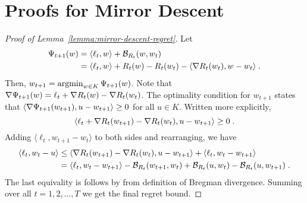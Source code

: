 \section{Proofs for Mirror Descent}
\label{section:mirror-descent-proofs}

\begin{proof}[Proof of Lemma~\ref{lemma:mirror-descent-regret}]
Let
\begin{align*}
\Psi_{t+1}(w)
& = \langle \ell_t, w \rangle + \mathcal{B}_{R_t}(w,w_t) \\
& = \langle \ell_t, w \rangle + R_t(w) - R_t(w_t) - \langle \nabla R_t(w_t) , w - w_t \rangle \; .
\end{align*}
Then, $w_{t+1} = \operatorname*{argmin}_{w \in K} \Psi_{t+1}(w)$. Note that $\nabla \Psi_{t+1}(w) = \ell_t + \nabla R_t(w) - \nabla R_t(w_t)$. The optimality
condition for $w_{t+1}$ states that $\langle \nabla \Psi_{t+1}(w_{t+1}), u - w_{t+1} \rangle \ge 0$ for all $u \in K$. Written more explicitly,
$$
\langle \ell_t + \nabla R_t(w_{t+1}) - \nabla R_t(w_t), u - w_{t+1} \rangle \ge 0 \; .
$$
Adding $\langle \ell_t, w_{t+1} - w_t \rangle$ to both sides and rearranging, we have
\begin{align*}
\langle \ell_t, w_t - u \rangle 
& \le \langle \nabla R_t(w_{t+1}) - \nabla R_t(w_t), u - w_{t+1} \rangle  + \langle \ell_t, w_t - w_{t+1} \rangle \\
& = \langle \ell_t, w_t - w_{t+1} \rangle - \mathcal{B}_{R_t}(w_{t+1}, w_t) + \mathcal{B}_{R_t}(u,w_t) - \mathcal{B}_{R_t}(u, w_{t+1}) \; .
\end{align*}
The last equivality is follows by from definition of Bregman divergence.
Summing over all $t=1,2,\dots,T$ we get the final regret bound.
\end{proof}

